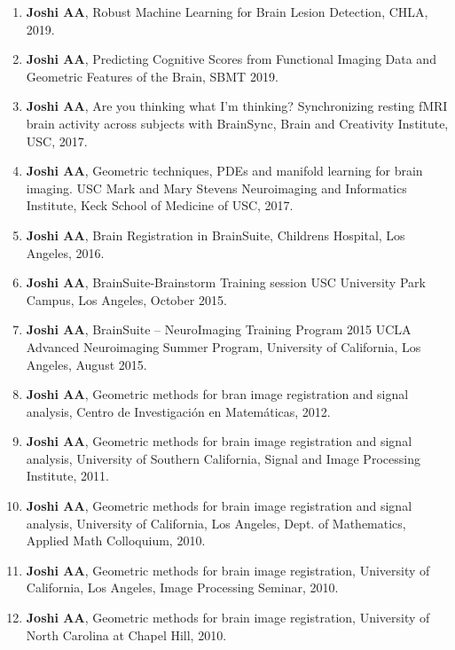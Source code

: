 \documentclass[overlapped,line,letterpaper]{res}
\begin{document}
\begin{resume}
\begin{enumerate}
    \item \textbf{Joshi AA}, Robust Machine Learning for Brain Lesion Detection, CHLA, 2019. 

    \item \textbf{Joshi AA}, Predicting Cognitive Scores from Functional Imaging Data and Geometric Features of the Brain, SBMT 2019.

    \item \textbf{Joshi AA}, Are you thinking what I'm thinking? Synchronizing resting fMRI brain activity across subjects with BrainSync, Brain and Creativity Institute, USC, 2017.

    \item \textbf{Joshi AA}, Geometric techniques, PDEs and manifold learning for brain imaging. USC Mark and Mary Stevens
Neuroimaging and Informatics Institute, Keck School of Medicine of USC, 2017.

    \item \textbf{Joshi AA}, Brain Registration in BrainSuite, Childrens Hospital, Los Angeles, 2016.

    \item \textbf{Joshi AA}, BrainSuite-Brainstorm Training session USC University Park Campus, Los Angeles, October 2015.

    \item \textbf{Joshi AA}, BrainSuite – NeuroImaging Training Program 2015 UCLA Advanced Neuroimaging Summer Program, University of California, Los Angeles, August 2015.  

    \item \textbf{Joshi AA}, Geometric methods for bran image registration and signal analysis, Centro de Investigación en Matemáticas, 2012.

    \item \textbf{Joshi AA}, Geometric methods for brain image registration and signal analysis, University of Southern California, Signal and Image Processing Institute, 2011.

    \item \textbf{Joshi AA}, Geometric methods for brain image registration and signal analysis, University of California, Los Angeles, Dept. of Mathematics, Applied Math Colloquium, 2010.

    \item \textbf{Joshi AA}, Geometric methods for brain image registration, University of California, Los Angeles, Image Processing Seminar, 2010. 

    \item \textbf{Joshi AA}, Geometric methods for brain image registration, University of North Carolina at Chapel Hill, 2010. 


\end{enumerate}
\end{resume}
\end{document}
